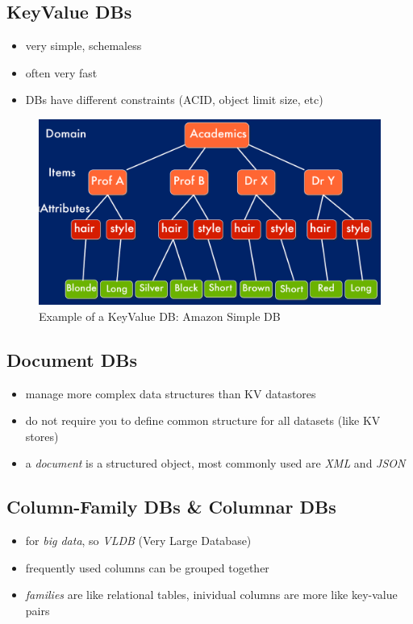 \documentclass[a4paper]{article}
\begin{document}
\begin{multicols}{3}
\subsection{KeyValue DBs}
\begin{itemize}
    \item very simple, schemaless
    \item often very fast
    \item DBs have different constraints (ACID, object limit size, etc)
\end{itemize}

\begin{figure}[H]
    \includegraphics[width=\linewidth]{AmazonSimpleDB.png}
    \caption{Example of a KeyValue DB: Amazon Simple DB}
    \label{fig:amazonsimpledb}
\end{figure}

\subsection{Document DBs}
\begin{itemize}
    \item manage more complex data structures than KV datastores
    \item do not require you to define common structure for all datasets (like KV stores)
    \item a \textit{document} is a structured object, most commonly used are \textit{XML} and \textit{JSON}
\end{itemize}

\subsection{Column-Family DBs \& Columnar DBs}
\begin{itemize}
    \item for \textit{big data}, so \textit{VLDB} (Very Large Database)
    \item frequently used columns can be grouped together
    \item \textit{families} are like relational tables, inividual columns are more like key-value pairs
\end{itemize}


\end{multicols}
\end{document}
